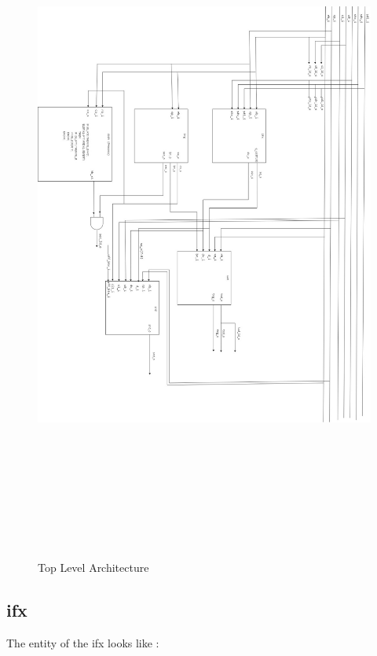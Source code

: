 \documentclass[12pt,a4paper]{article}
\begin{document}
\begin{figure}[H]
\centering
\includegraphics [width=16cm,height=23cm]{Top.jpg}
\caption{Top Level Architecture}
\label{Top Level Architecture}
\end{figure}
\newpage




\subsection{ifx}
The entity of the ifx looks like :\\
\end{document}
